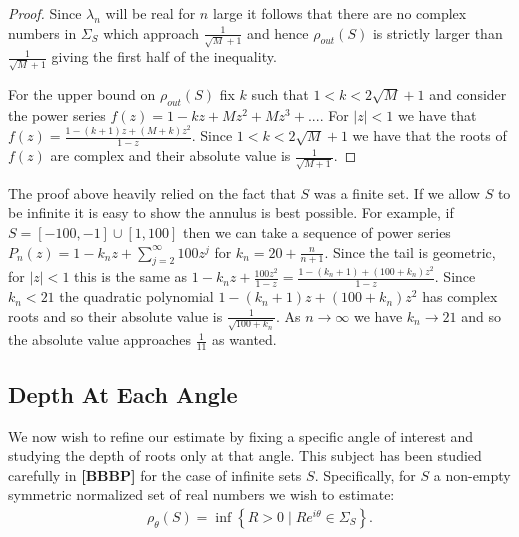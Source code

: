 \documentclass[11pt]{amsart}
\numberwithin{theorem}{section} %
\numberwithin{corollary}{section}
\numberwithin{lemma}{section}
\numberwithin{proposition}{section}
\numberwithin{definition}{section}
\begin{document}
\begin{proof}
Since $\lambda_n$ will be real for $n$ large it follows that there are no complex numbers in $\Sigma_S$ which approach $\frac{1}{\sqrt{M}+1}$ and hence $\rho_{out}(S)$ is strictly larger than $\frac{1}{\sqrt{M}+1}$ giving the first half of the inequality.

For the upper bound on $\rho_{out}(S)$ fix $k$ such that $1 < k < 2\sqrt{M}+1$ and consider the power series $f(z) = 1 - kz + Mz^2+Mz^3 + ...$. For $|z| < 1$ we have that $f(z) = \frac{1-(k+1)z + (M+k)z^2}{1-z}$. Since $1 < k < 2\sqrt{M}+1$ we have that the roots of $f(z)$ are complex and their absolute value is $\frac{1}{\sqrt{M+1}}$. 



\end{proof}

The proof above heavily relied on the fact that $S$ was a finite set. If we allow $S$ to be infinite it is easy to show the annulus is best possible. For example, if $S = [-100, -1] \cup [1, 100]$ then we can take a sequence of power series $P_n(z) = 1 - k_nz + \sum_{j=2}^\infty 100z^j$ for $k_n = 20 + \frac{n}{n+1}$. Since the tail is geometric, for $|z| < 1$ this is the same as $1 - k_nz + \frac{100z^2}{1-z} = \frac{1 - (k_n + 1) + (100 + k_n)z^2}{1-z}$. Since $k_n < 21$ the quadratic polynomial $1 - (k_n+1)z + (100+k_n)z^2$ has complex roots and so their absolute value is $\frac{1}{\sqrt{100+k_n}}$. As $n \rightarrow \infty$ we have $k_n \rightarrow 21$ and so the absolute value approaches $\frac{1}{11}$ as wanted.















\subsection{Depth At Each Angle}


We now wish to refine our estimate by fixing a specific angle of interest and studying the depth of roots only at that angle. This subject has been studied carefully in \textbf{[BBBP]} for the case of infinite sets $S$. Specifically, for $S$ a non-empty symmetric normalized set of real numbers we wish to estimate:
\begin{align*}
\rho_{\theta}(S) = \inf \left\{ R > 0 \mid Re^{i\theta} \in \Sigma_S \right\}.
\end{align*}
\end{document}
